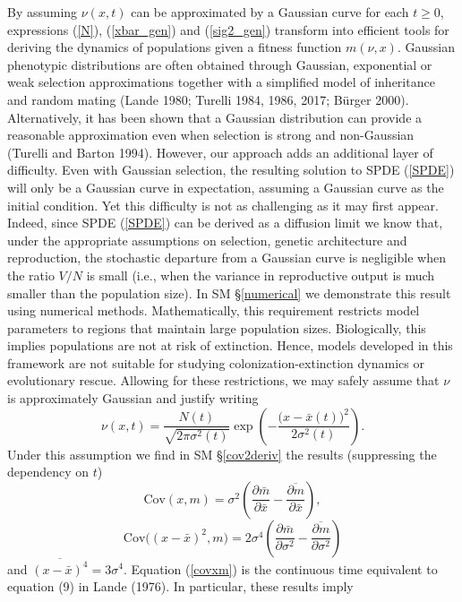 \documentclass[]{article}
\begin{document}
By assuming \(\nu(x,t)\) can be approximated by a Gaussian curve for
each \(t\geq0\), expressions (\ref{N}), (\ref{xbar_gen}) and
(\ref{sig2_gen}) transform into efficient tools for deriving the
dynamics of populations given a fitness function \(m(\nu,x)\). Gaussian
phenotypic distributions are often obtained through Gaussian,
exponential or weak selection approximations together with a simplified
model of inheritance and random mating (Lande 1980; Turelli 1984, 1986,
2017; Bürger 2000). Alternatively, it has been shown that a Gaussian
distribution can provide a reasonable approximation even when selection
is strong and non-Gaussian (Turelli and Barton 1994). However, our
approach adds an additional layer of difficulty. Even with Gaussian
selection, the resulting solution to SPDE (\ref{SPDE}) will only be a
Gaussian curve in expectation, assuming a Gaussian curve as the initial
condition. Yet this difficulty is not as challenging as it may first
appear. Indeed, since SPDE (\ref{SPDE}) can be derived as a diffusion
limit we know that, under the appropriate assumptions on selection,
genetic architecture and reproduction, the stochastic departure from a
Gaussian curve is negligible when the ratio \(V/N\) is small (i.e., when
the variance in reproductive output is much smaller than the population
size). In SM \S\ref{numerical} we demonstrate this result using
numerical methods. Mathematically, this requirement restricts model
parameters to regions that maintain large population sizes.
Biologically, this implies populations are not at risk of extinction.
Hence, models developed in this framework are not suitable for studying
colonization-extinction dynamics or evolutionary rescue. Allowing for
these restrictions, we may safely assume that \(\nu\) is approximately
Gaussian and justify writing \begin{equation}
\nu(x,t)=\frac{N(t)}{\sqrt{2\pi\sigma^2(t)}}\exp\left(-\frac{\big(x-\bar x(t)\big)^2}{2\sigma^2(t)}\right).
\end{equation} Under this assumption we find in SM \S\ref{cov2deriv} the
results (suppressing the dependency on \(t\))
\begin{equation}\label{covxm}
\mathrm{Cov}(x,m)=\sigma^2\left(\frac{\partial\bar m}{\partial\bar x}-\overline{\frac{\partial m}{\partial\bar x}}\right),
\end{equation} \begin{equation}
\mathrm{Cov}\Big((x-\bar x)^2,m\Big)=2\sigma^4\left(\frac{\partial\bar m}{\partial\sigma^2}-\overline{\frac{\partial m}{\partial\sigma^2}}\right)
\end{equation} and \(\overline{(x-\bar x)^4}=3\sigma^4\). Equation
(\ref{covxm}) is the continuous time equivalent to equation (9) in Lande
(1976). In particular, these results imply
\end{document}
